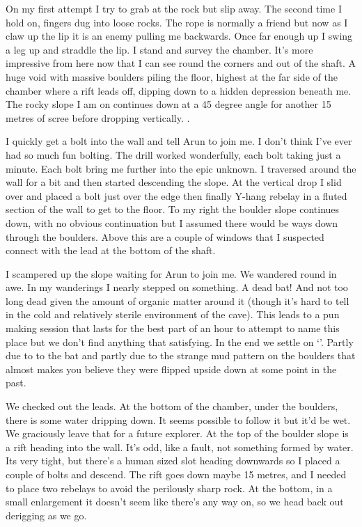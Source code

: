 On my first attempt I try to grab at the rock but slip away. The second time I hold on, fingers dug into loose rocks. The rope is normally a friend but now as I claw up the lip it is an enemy pulling me backwards. Once far enough up I swing a leg up and straddle the lip. I stand and survey the chamber. It's more impressive from here now that I can see round the corners and out of the shaft. A huge void with massive boulders piling the floor, highest at the far side of the chamber where a rift leads off, dipping down to a hidden depression beneath me. The rocky slope I am on continues down at a 45 degree angle for another 15 metres of scree before dropping vertically. . 

I quickly get a bolt into the wall and tell Arun to join me. I don't think I've ever had so much fun bolting. The drill worked wonderfully, each bolt taking just a minute. Each bolt bring me further into the epic unknown. I traversed around the wall for a bit and then started descending the slope. At the vertical drop I slid over and placed a bolt just over the edge then finally Y-hang rebelay in a fluted section of the wall to get to the floor. To my right the boulder slope continues down, with no obvious continuation but I assumed there would be ways down through the boulders. Above this are a couple of windows that I suspected connect with the lead at the bottom of the shaft.

I scampered up the slope waiting for Arun to join me. We wandered round in awe. In my wanderings I nearly stepped on something. A dead bat! And not too long dead given the amount of organic matter around it (though it's hard to tell in the cold and relatively sterile environment of the cave). This leads to a pun making session that lasts for the best part of an hour to attempt to name this place but we don't find anything that satisfying. In the end we settle on `'. Partly due to to the bat and partly due to the strange mud pattern on the boulders that almost makes you believe they were flipped upside down at some point in the past.

We checked out the leads. At the bottom of the chamber, under the boulders, there is some water dripping down. It seems possible to follow it but it'd be wet. We graciously leave that for a future explorer. At the top of the boulder slope is a rift heading into the wall. It's odd, like a fault, not something formed by water. Its very tight, but there's a human sized slot heading downwards so I placed a couple of bolts and descend. The rift goes down maybe 15 metres, and I needed to place two rebelays to avoid the perilously sharp rock. At the bottom, in a small enlargement it doesn't seem like there's any way on, so we head back out derigging as we go. 

